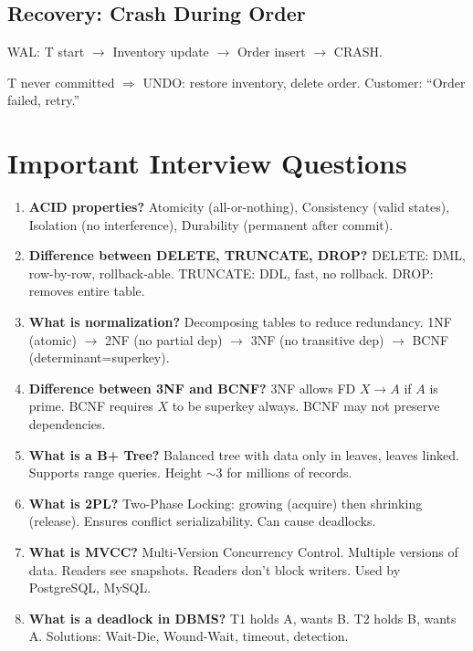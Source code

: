 \documentclass[12pt,a4paper]{article}
\begin{document}
\subsection{Recovery: Crash During Order}
WAL: T start $\to$ Inventory update $\to$ Order insert $\to$ CRASH.

T never committed $\Rightarrow$ UNDO: restore inventory, delete order. Customer: ``Order failed, retry.''

\section{Important Interview Questions}

\begin{enumerate}[leftmargin=*, label=\textbf{Q\arabic*.}]

\item \textbf{ACID properties?} Atomicity (all-or-nothing), Consistency (valid states), Isolation (no interference), Durability (permanent after commit).

\item \textbf{Difference between DELETE, TRUNCATE, DROP?} DELETE: DML, row-by-row, rollback-able. TRUNCATE: DDL, fast, no rollback. DROP: removes entire table.

\item \textbf{What is normalization?} Decomposing tables to reduce redundancy. 1NF (atomic) $\to$ 2NF (no partial dep) $\to$ 3NF (no transitive dep) $\to$ BCNF (determinant=superkey).

\item \textbf{Difference between 3NF and BCNF?} 3NF allows FD $X \to A$ if $A$ is prime. BCNF requires $X$ to be superkey always. BCNF may not preserve dependencies.

\item \textbf{What is a B+ Tree?} Balanced tree with data only in leaves, leaves linked. Supports range queries. Height $\sim 3$ for millions of records.

\item \textbf{What is 2PL?} Two-Phase Locking: growing (acquire) then shrinking (release). Ensures conflict serializability. Can cause deadlocks.

\item \textbf{What is MVCC?} Multi-Version Concurrency Control. Multiple versions of data. Readers see snapshots. Readers don't block writers. Used by PostgreSQL, MySQL.

\item \textbf{What is a deadlock in DBMS?} T1 holds A, wants B. T2 holds B, wants A. Solutions: Wait-Die, Wound-Wait, timeout, detection.


\end{enumerate}
\end{document}
